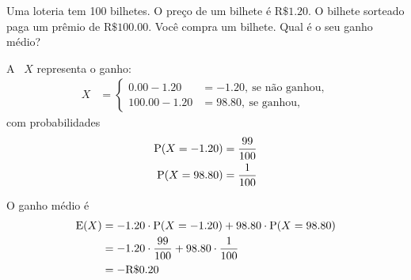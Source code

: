 \begin{example}
    Uma loteria tem 100 bilhetes. O preço de um bilhete
    é R$\$ 1.20$. O bilhete sorteado paga um prêmio de
    R$\$ 100.00$. Você compra um bilhete. Qual é
    o seu ganho médio?

    \bigskip
    A \va\ $X$ representa o ganho:
    \begin{align*}
        X &= \begin{cases}
            0.00 - 1.20 &= -1.20,\ \text{se não ganhou}, \\
            100.00 - 1.20 &= 98.80,\ \text{se ganhou},
        \end{cases}
    \end{align*}
    com probabilidades
    \begin{align*}
        \operatorname{P}(X = -1.20) &= \frac{99}{100} \\
        \operatorname{P}(X = 98.80) &= \frac{1}{100}
    \end{align*}

    O ganho médio é
    \begin{align*}
        \operatorname{E}(X)
        &= -1.20 \cdot \operatorname{P}(X = -1.20)
            + 98.80 \cdot \operatorname{P}(X = 98.80) \\
        &= -1.20 \cdot \frac{99}{100}
            + 98.80 \cdot \frac{1}{100} \\
        &= -\text{R}\$ 0.20
    \end{align*}
\end{example}

